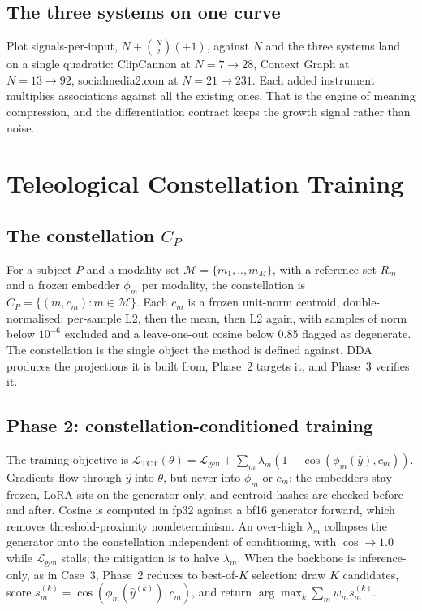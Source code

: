 \documentclass[10pt,twocolumn]{article}
\begin{document}
\subsection{The three systems on one curve}
Plot signals-per-input, $N+\binom{N}{2}(+1)$, against $N$ and the three systems
land on a single quadratic: ClipCannon at $N=7\to28$, Context Graph at
$N=13\to92$, socialmedia2.com at $N=21\to231$. Each added instrument multiplies associations
against all the existing ones. That is the engine of meaning compression, and the
differentiation contract keeps the growth signal rather than noise.

\section{Teleological Constellation Training}
\label{sec:tct}

\subsection{The constellation $C_P$}
For a subject $P$ and a modality set $\mathcal{M}=\{m_1,..,m_M\}$, with a reference
set $R_m$ and a frozen embedder $\phi_m$ per modality, the constellation is
$C_P=\{(m,c_m):m\in\mathcal{M}\}$. Each $c_m$ is a frozen unit-norm centroid,
double-normalised: per-sample L2, then the mean, then L2 again, with samples of
norm below $10^{-6}$ excluded and a leave-one-out cosine below $0.85$ flagged as
degenerate. The constellation is the single object the method is defined against.
DDA produces the projections it is built from, Phase~2 targets it, and Phase~3
verifies it.

\subsection{Phase 2: constellation-conditioned training}
The training objective is
$\mathcal{L}_{\mathrm{TCT}}(\theta) = \mathcal{L}_{\mathrm{gen}} +
\sum_m\lambda_m(1-\cos(\phi_m(\hat y),c_m))$. Gradients flow through $\hat y$ into
$\theta$, but never into $\phi_m$ or $c_m$: the embedders stay frozen, LoRA sits on
the generator only, and centroid hashes are checked before and after. Cosine is
computed in fp32 against a bf16 generator forward, which removes
threshold-proximity nondeterminism. An over-high $\lambda_m$ collapses the
generator onto the constellation independent of conditioning, with $\cos\to1.0$
while $\mathcal{L}_{\mathrm{gen}}$ stalls; the mitigation is to halve $\lambda_m$.
When the backbone is inference-only, as in Case~3, Phase~2 reduces to best-of-$K$
selection: draw $K$ candidates, score $s_m^{(k)}=\cos(\phi_m(\hat y^{(k)}),c_m)$,
and return $\arg\max_k\sum_m w_m s_m^{(k)}$.
\end{document}
